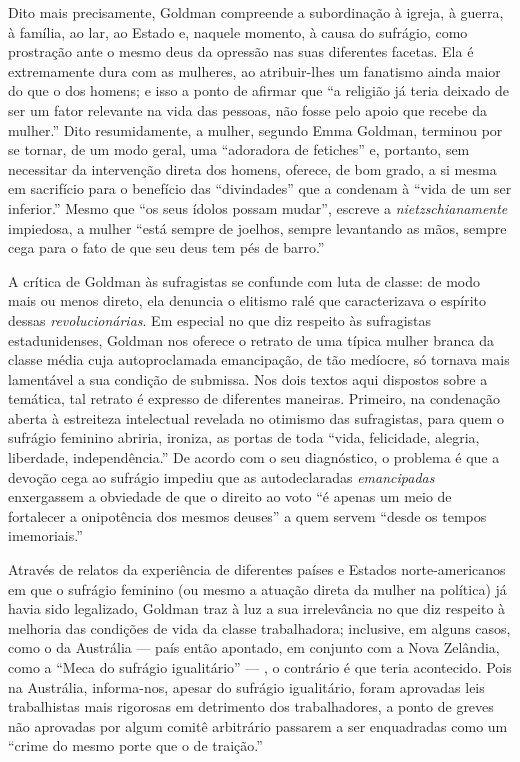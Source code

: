 Dito mais precisamente,
Goldman compreende a subordinação à igreja, à guerra, à família, ao lar,
ao Estado e, naquele momento, à causa do sufrágio, como prostração ante
o mesmo deus da opressão nas suas diferentes facetas. Ela é extremamente
dura com as mulheres, ao atribuir-lhes um fanatismo ainda maior do que o
dos homens; e isso a ponto de afirmar que ``a religião já teria deixado
de ser um fator relevante na vida das pessoas, não fosse pelo apoio que
recebe da mulher.'' Dito resumidamente, a mulher, segundo Emma Goldman,
terminou por se tornar, de um modo geral, uma ``adoradora de fetiches''
e, portanto, sem necessitar da intervenção direta dos homens, oferece,
de bom grado, a si mesma em sacrifício para o benefício das
``divindades'' que a condenam à ``vida de um ser inferior.'' Mesmo que
``os seus ídolos possam mudar'', escreve a \textit{nietzschianamente} impiedosa,
a mulher ``está sempre de joelhos, sempre levantando as mãos, sempre
cega para o fato de que seu deus tem pés de barro.''

A crítica de Goldman às sufragistas se confunde com luta de classe: de
modo mais ou menos direto, ela denuncia o elitismo ralé que
caracterizava o espírito dessas \textit{revolucionárias}. Em especial no que
diz respeito às sufragistas estadunidenses, Goldman nos oferece o
retrato de uma típica mulher branca da classe média cuja autoproclamada
emancipação, de tão medíocre, só tornava mais lamentável a sua condição
de submissa. Nos dois textos aqui dispostos sobre a temática, tal
retrato é expresso de diferentes maneiras. Primeiro, na condenação
aberta à estreiteza intelectual revelada no otimismo das sufragistas,
para quem o sufrágio feminino abriria, ironiza, as portas de toda
``vida, felicidade, alegria, liberdade, independência.'' De acordo com o
seu diagnóstico, o problema é que a devoção cega ao sufrágio impediu
que as autodeclaradas \textit{emancipadas} enxergassem a obviedade de que o
direito ao voto ``é apenas um meio de fortalecer a onipotência dos
mesmos deuses'' a quem servem ``desde os tempos imemoriais.''

Através de relatos da experiência de diferentes países e Estados
norte-americanos em que o sufrágio feminino (ou mesmo a atuação direta
da mulher na política) já havia sido legalizado, Goldman traz à luz a
sua irrelevância no que diz respeito à melhoria das condições de vida da
classe trabalhadora; inclusive, em alguns casos, como o da Austrália ---
país então apontado, em conjunto com a Nova Zelândia, como a ``Meca do
sufrágio igualitário'' --- , o contrário é que teria acontecido. Pois na
Austrália, informa-nos, apesar do sufrágio igualitário, foram
aprovadas leis trabalhistas mais rigorosas em detrimento dos
trabalhadores, a ponto de greves não aprovadas por algum comitê
arbitrário passarem a ser enquadradas como um ``crime do mesmo porte
que o de traição.''

